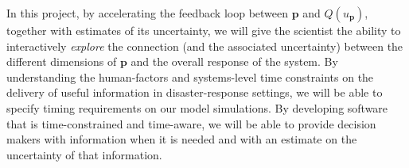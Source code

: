 \documentclass[a4paper,fontsize=12pt]{scrartcl}
\begin{document}
In this project, by accelerating the feedback loop between
$\mathbf{p}$ and $Q(u_{\mathbf{p}})$, together with estimates of its
uncertainty, we will give the scientist the ability to interactively
\emph{explore} the connection (and the associated uncertainty) between
the different dimensions of $\mathbf{p}$ and the overall response of
the system. By understanding the human-factors and systems-level time
constraints on the delivery of useful information in disaster-response
settings, we will be able to specify timing requirements on our model
simulations. By developing software that is time-constrained and
time-aware, we will be able to provide decision makers with
information when it is needed and with an estimate on the uncertainty
of that information.

\end{document}
